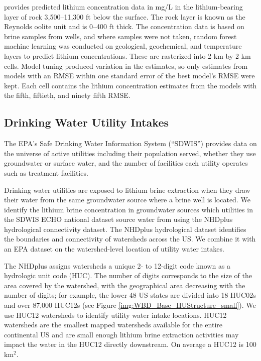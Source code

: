 \documentclass{article}
\begin{document}
\textcite{knierim2024evaluation} provides predicted lithium concentration data in mg/L in the lithium-bearing layer of rock 3,500–11,300 ft below the surface.  The rock layer is known as the Reynolds oolite unit and is 0–400 ft thick. The concentration data is based on brine samples from wells, and where samples were not taken, random forest machine learning was conducted on geological, geochemical, and temperature layers to predict lithium concentrations. These are rasterized into 2 km by 2 km cells. Model tuning produced variation in the estimates, so only estimates from models with an RMSE within one standard error of the best model's RMSE were kept. Each cell contains the lithium concentration estimates from the models with the fifth, fiftieth, and ninety fifth RMSE.

\subsection{Drinking Water Utility Intakes}

The EPA's Safe Drinking Water Information System (``SDWIS'') provides data on the universe of active utilities including their population served, whether they use groundwater or surface water, and the number of facilities each utility operates such as treatment facilities.

Drinking water utilities are exposed to lithium brine extraction when they draw their water from the same groundwater source where a brine well is located. We identify the lithium brine concentration in groundwater sources which utilities in the SDWIS ECHO national dataset source water from using the NHDplus hydrological connectivity dataset. The NHDplus hydrological dataset identifies the boundaries and connectivity of watersheds across the US. We combine it with an EPA dataset on the watershed-level location of utility water intakes. 

The NHDplus assigns watersheds a unique 2- to 12-digit code known as a hydrologic unit code (HUC). The number of digits corresponds to the size of the area covered by the watershed, with the geographical area decreasing with the number of digits; for example, the lower 48 US states are divided into 18 HUC02s and over 87,000 HUC12s (see Figure \ref{img:WBD_Base_HUStructure_small}). We use HUC12 watersheds to identify utility water intake locations. HUC12 watersheds are the smallest mapped watersheds available for the entire continental US and are small enough lithium brine extraction activities may impact the water in the HUC12 directly downstream. On average a HUC12 is 100 km$^2$.
\end{document}
